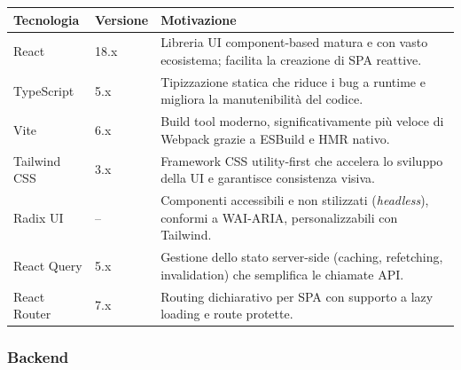 \begin{center}
\small
\begin{tabular}{|l|l|p{6cm}|}
\hline
\textbf{Tecnologia} & \textbf{Versione} & \textbf{Motivazione} \\
\hline
React & 18.x & Libreria UI component-based matura e con vasto ecosistema; facilita la creazione di SPA reattive. \\
\hline
TypeScript & 5.x & Tipizzazione statica che riduce i bug a runtime e migliora la manutenibilità del codice. \\
\hline
Vite & 6.x & Build tool moderno, significativamente più veloce di Webpack grazie a ESBuild e HMR nativo. \\
\hline
Tailwind CSS & 3.x & Framework CSS utility-first che accelera lo sviluppo della UI e garantisce consistenza visiva. \\
\hline
Radix UI & -- & Componenti accessibili e non stilizzati (\emph{headless}), conformi a WAI-ARIA, personalizzabili con Tailwind. \\
\hline
React Query & 5.x & Gestione dello stato server-side (caching, refetching, invalidation) che semplifica le chiamate API. \\
\hline
React Router & 7.x & Routing dichiarativo per SPA con supporto a lazy loading e route protette. \\
\hline
\end{tabular}
\end{center}

\subsubsection{Backend}

